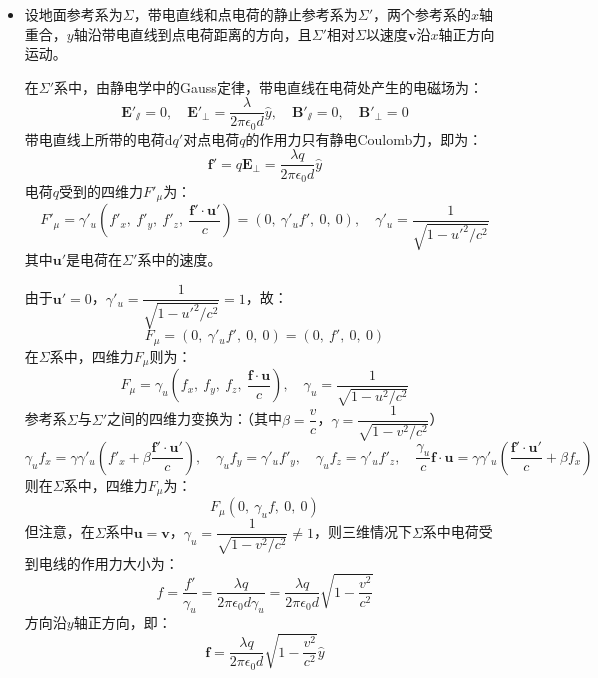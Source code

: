 \documentclass[a4paper,fontset=none]{ctexart}
\begin{document}
\begin{itemize}
    \item[16.(a)]
    设地面参考系为$\varSigma$，带电直线和点电荷的静止参考系为$\varSigma'$，两个参考系的$x$轴重合，$y$轴沿带电直线到点电荷距离的方向，且$\varSigma'$相对$\varSigma$以速度$\bm{v}$沿$x$轴正方向运动。

    在$\varSigma'$系中，由静电学中的Gauss定律，带电直线在电荷处产生的电磁场为：
    \[
        \bm{E}'_\varparallel = 0,\quad
        \bm{E}'_\perp = \frac{\lambda}{2\pi\epsilon_0d}\hat{y},\quad
        \bm{B}'_\varparallel = 0,\quad
        \bm{B}'_\perp = 0
    \]
    带电直线上所带的电荷$\mathrm{d}q'$对点电荷$q$的作用力只有静电Coulomb力，即为：
    \[
        \bm{f}' = q\bm{E}_\perp = \frac{\lambda q}{2\pi\epsilon_0d}\hat{y}
    \]
    电荷$q$受到的四维力$F'_\mu$为：
    \[
        F'_\mu = \gamma'_u\left(f'_x,\ f'_y,\ f'_z,\ \frac{\bm{f}'\cdot\bm{u}'}{c}\right) = (0,\ \gamma'_u f',\ 0,\ 0),\quad \gamma'_u = \frac{1}{\sqrt{1-{u'}^2/c^2}}
    \]
    其中$\bm{u}'$是电荷在$\varSigma'$系中的速度。

    由于$\bm{u}'=0$，$\gamma'_u=\dfrac{1}{\sqrt{1-{u'}^2/c^2}}=1$，故：
    \[
        F_\mu = (0,\ \gamma'_u f',\ 0,\ 0) = (0,\ f',\ 0,\ 0)
    \]
    在$\varSigma$系中，四维力$F_\mu$则为：
    \[
        F_\mu = \gamma_u\left(f_x,\ f_y,\ f_z,\ \frac{\bm{f}\cdot\bm{u}}{c}\right),\quad \gamma_u = \frac{1}{\sqrt{1-u^2/c^2}}
    \]
    参考系$\varSigma$与$\varSigma'$之间的四维力变换为：（其中$\beta=\dfrac{v}{c}$，$\gamma=\dfrac{1}{\sqrt{1-v^2/c^2}}$）
    \[
        \gamma_u f_x = \gamma\gamma'_u\left(f'_x + \beta\frac{\bm{f}'\cdot\bm{u}'}{c}\right),\quad
        \gamma_u f_y = \gamma'_u f'_y,\quad
        \gamma_u f_z = \gamma'_u f'_z,\quad
        \frac{\gamma_u}{c}\bm{f}\cdot\bm{u} = \gamma\gamma'_u\left(\frac{\bm{f}'\cdot\bm{u}'}{c} + \beta f_x\right)
    \]
    则在$\varSigma$系中，四维力$F_\mu$为：
    \[
        F_\mu(0,\ \gamma_u f,\ 0,\ 0)
    \]
    但注意，在$\varSigma$系中$\bm{u}=\bm{v}$，$\gamma_u=\dfrac{1}{\sqrt{1-v^2/c^2}}\neq1$，则三维情况下$\varSigma$系中电荷受到电线的作用力大小为：
    \[
        f = \frac{f'}{\gamma_u} = \frac{\lambda q}{2\pi\epsilon_0d\gamma_u} = \frac{\lambda q}{2\pi\epsilon_0d}\sqrt{1 - \frac{v^2}{c^2}}
    \]
    方向沿$y$轴正方向，即：
    \[
        \bm{f} = \frac{\lambda q}{2\pi\epsilon_0d}\sqrt{1 - \frac{v^2}{c^2}}\hat{y}
    \]


\end{itemize}
\end{document}
